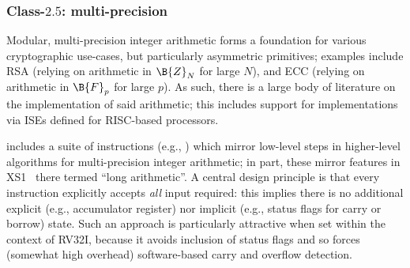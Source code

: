 





%
%
%


\subsubsection{Class-$2.5$: multi-precision}
\label{sec:bg:feature:2:5}

Modular, multi-precision integer arithmetic forms a foundation for various
cryptographic use-cases, but particularly asymmetric primitives; examples 
include
RSA (relying on arithmetic in $\B{Z}_N$ for large $N$),
and
ECC (relying on arithmetic in $\B{F}_p$ for large $p$).
As such, there is a large body of literature on the implementation of said 
arithmetic; this includes support for implementations via ISEs defined for 
RISC-based processors.

\XCID includes a suite of instructions 
(e.g., )
which mirror low-level steps in higher-level algorithms for multi-precision 
integer arithmetic; in part, these mirror features in 
XS1~\cite[Section 18]{SCARV:XS1:09} 
there termed ``long arithmetic''.  A central design principle is that every
instruction explicitly accepts {\em all} input required: this implies there
is no additional
explicit (e.g., accumulator register) 
nor 
implicit (e.g., status flags for carry or borrow)
state.
Such an approach is particularly attractive when set within the context of 
RV32I, because it avoids inclusion of status flags and so forces (somewhat 
high overhead) software-based carry and overflow detection.

